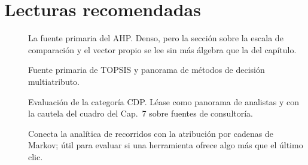 \section{Lecturas recomendadas}

\begin{description}
  \item[\textcite{saaty1977}] La fuente primaria del AHP. Denso, pero la sección sobre la escala de comparación y el vector propio se lee sin más álgebra que la del capítulo.
  \item[\textcite{hwang1981}] Fuente primaria de TOPSIS y panorama de métodos de decisión multiatributo.
  \item[\textcite{gartner2026cdp}] Evaluación de la categoría CDP. Léase como panorama de analistas y con la cautela del cuadro del Cap.~7 sobre fuentes de consultoría.
  \item[\textcite{anderl2016}] Conecta la analítica de recorridos con la atribución por cadenas de Markov; útil para evaluar si una herramienta ofrece algo más que el último clic.
\end{description}
